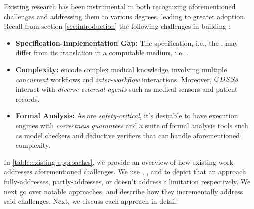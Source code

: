 Existing research has been instrumental in both recognizing aforementioned
challenges and addressing them to various degrees, leading to greater \CDSS{}
adoption.
Recall from section \ref{sec:introduction} the following
challenges in building \CDSSs{}:
\begin{itemize}
  \item \textbf{Specification-Implementation Gap:} The specification,
    i.e., the \BPG{}, may differ from its translation in a computable
    medium, i.e. \CIG{}.
  \item \textbf{Complexity:} \BPGs{} encode complex medical knowledge,
    involving multiple \emph{concurrent} workflows and \emph{inter-workflow}
    interactions. Moreover, $CDSSs{}$ interact with \emph{diverse
    external agents} such as medical sensors and patient records.
  \item \textbf{Formal Analysis:} As \CDSSs{} are \emph{safety-critical},
    it's desirable to have execution engines with \emph{correctness guarantees}
    and a suite of formal analysis tools such as model checkers and deductive
    verifiers that can handle aforementioned complexity.
\end{itemize}

In \tablename{} \ref{table:existing-approaches}, we provide an overview of
how existing work addresses aforementioned challenges. We use
\greencheck{}, \cancelcheck{}, and \redcross{} to depict that an approach
fully-addresses, partly-addresses, or doesn't address a limitation respectively.
We next go over notable approaches, and describe how they incrementally
address said challenges. Next, we discuss each approach in detail.

